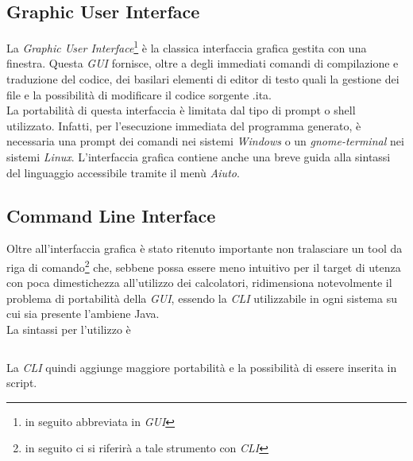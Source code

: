 \documentclass[11pt, a4paper, twoside, notitlepage]{report}
\begin{document}
\subsection{Graphic User Interface}
La \emph{Graphic User Interface}\footnote{in seguito abbreviata in \emph{GUI}} è
la classica interfaccia grafica gestita con una finestra. Questa \emph{GUI}
fornisce, oltre a degli immediati comandi di compilazione e traduzione del
codice, dei basilari elementi di editor di testo quali la gestione dei file e
la possibilità di modificare il codice sorgente .ita.
\\La portabilità di questa interfaccia è limitata dal tipo di prompt o shell
utilizzato. Infatti, per l'esecuzione immediata del programma generato, è
necessaria una prompt dei comandi nei sistemi \emph{Windows} o un
\emph{gnome-terminal} nei sistemi \emph{Linux}.
L'interfaccia grafica contiene anche una breve guida alla sintassi del
linguaggio accessibile tramite il menù \emph{Aiuto}.
\subsection{Command Line Interface}
Oltre all'interfaccia grafica è stato ritenuto importante non tralasciare un
tool da riga di comando\footnote{in seguito ci si riferirà a tale strumento
con \emph{CLI}} che, sebbene possa essere meno intuitivo per il target di utenza
con poca dimestichezza all'utilizzo dei calcolatori, ridimensiona notevolmente
il problema di portabilità della \emph{GUI}, essendo la \emph{CLI} utilizzabile
in ogni sistema su cui sia presente l'ambiene Java.
\\La sintassi per l'utilizzo è
\begin{verbatim}

\end{verbatim}
La \emph{CLI} quindi aggiunge maggiore portabilità e la possibilità di essere
inserita in script.
\end{document}
